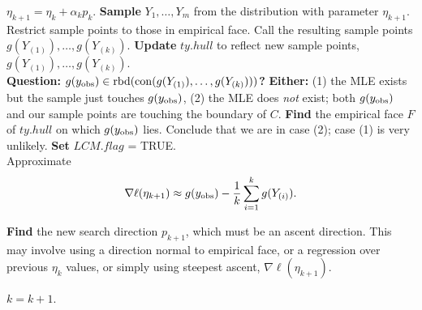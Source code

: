 {\begin{algorithmic}[1]
\State $\eta_{k+1} = \eta_k + \alpha_k p_k$.
\State \textbf{Sample} $Y_1, \ldots, Y_m$ from the distribution with parameter $\eta_{k+1}$.
	\State Restrict sample points to those in empirical face.
\EndIf
\State Call the resulting sample points $g(Y_{(1)}), \ldots, g(Y_{(k)})$.
\State \textbf{Update} $ty.hull$ to reflect new sample points, $g(Y_{(1)}), \ldots, g(Y_{(k)})$.\\
\State \textbf{Question: $g(y_{\text{obs}}) \in \operatorname{rbd}( \operatorname{con}(g(Y_{(1)}), \ldots, g(Y_{(k)}) ))$? }
{} %
	\State \textbf{Either:}
	\State (1) the MLE exists but the sample just touches $g(y_{\text{obs}})$, 
	\State (2) the MLE does \emph{not} exist; both $g(y_{\text{obs}})$ and our sample points  
	\State are touching the boundary of $C$.
	\State \textbf{Find} the empirical face $F$ of $ty.hull$ on which $g(y_{\text{obs}})$ lies.
		\State Conclude that we are in case (2); case (1) is very unlikely.
		\State \textbf{Set} $LCM.flag$ = TRUE.
	\EndIf
\EndIf\\
	\State Approximate
	\begin{align} \label{E:nabla ell approx LCM}
	\nabla \ell( \eta_{k+1}) \approx g(y_{\text{obs}}) - \frac{1}{k}\sum_{i=1}^k g(Y_{(i)}).
	\end{align}


\State \textbf{Find} the new search direction $p_{k+1}$, which must be an ascent 
direction.
\Statex This may involve using a direction normal to empirical face, or a regression 
\Statex over previous $\eta_k$ values, or simply using steepest ascent, $\nabla \ell
( \eta_{k+1})$.

\State $k = k + 1$.
\EndWhile
\end{algorithmic}
}

